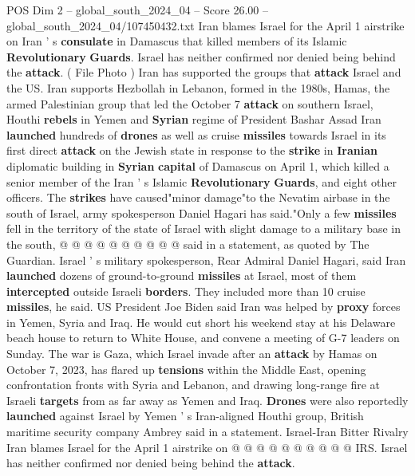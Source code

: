 \begin{textsample}{POS Dim 2 – global\_south\_2024\_04 – Score 26.00 – global\_south\_2024\_04/107450432.txt}  \label{ex:f2_pos_048}
Iran blames Israel for the April 1 airstrike on Iran ' s \textbf{consulate} in Damascus that killed members of its Islamic \textbf{Revolutionary} \textbf{Guards}.
Israel has neither confirmed nor denied being behind the \textbf{attack}. ( File Photo ) Iran has supported the groups that \textbf{attack} Israel and the US.
Iran supports Hezbollah in Lebanon, formed in the 1980s, Hamas, the armed Palestinian group that led the October 7 \textbf{attack} on southern Israel, Houthi \textbf{rebels} in Yemen and \textbf{Syrian} regime of President Bashar Assad Iran \textbf{launched} hundreds of \textbf{drones} as well as cruise \textbf{missiles} towards Israel in its first direct \textbf{attack} on the Jewish state in response to the \textbf{strike} in \textbf{Iranian} diplomatic building in \textbf{Syrian} \textbf{capital} of Damascus on April 1, which killed a senior member of the Iran ' s Islamic \textbf{Revolutionary} \textbf{Guards}, and eight other officers.
The \textbf{strikes} have caused"minor damage"to the Nevatim airbase in the south of Israel, army spokesperson Daniel Hagari has said."Only a few \textbf{missiles} fell in the territory of the state of Israel with slight damage to a military base in the south, @ @ @ @ @ @ @ @ @ @ said in a statement, as quoted by The Guardian.
Israel ' s military spokesperson, Rear Admiral Daniel Hagari, said Iran \textbf{launched} dozens of ground-to-ground \textbf{missiles} at Israel, most of them \textbf{intercepted} outside Israeli \textbf{borders}.
They included more than 10 cruise \textbf{missiles}, he said.
US President Joe Biden said Iran was helped by \textbf{proxy} forces in Yemen, Syria and Iraq.
He would cut short his weekend stay at his Delaware beach house to return to White House, and convene a meeting of G-7 leaders on Sunday.
The war is Gaza, which Israel invade after an \textbf{attack} by Hamas on October 7, 2023, has flared up \textbf{tensions} within the Middle East, opening confrontation fronts with Syria and Lebanon, and drawing long-range fire at Israeli \textbf{targets} from as far away as Yemen and Iraq. \textbf{Drones} were also reportedly \textbf{launched} against Israel by Yemen ' s Iran-aligned Houthi group, British maritime security company Ambrey said in a statement.
Israel-Iran Bitter Rivalry Iran blames Israel for the April 1 airstrike on @ @ @ @ @ @ @ @ @ @ IRS.
Israel has neither confirmed nor denied being behind the \textbf{attack}.

\end{textsample}
